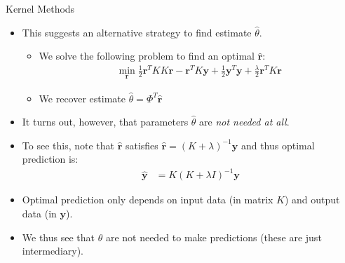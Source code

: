 \documentclass[handout,9pt]{beamer}
\begin{document}
\begin{frame}{Kernel Methods}
\begin{itemize}
  \setlength{\itemsep}{10pt}
\item This suggests an alternative strategy to find estimate $\hat{\theta}$. 
\begin{itemize}
\item We solve the following problem to find an optimal $\hat{\mathbf{r}}$: 
\begin{align*}
\min_{\mathbf{r}} \frac{1}{2}\mathbf{r}^TKK\mathbf{r}-\mathbf{r}^TK\mathbf{y}+\frac{1}{2}\mathbf{y}^T\mathbf{y}+\frac{\lambda}{2}\mathbf{r}^TK\mathbf{r}
\end{align*}
\item We recover estimate $\hat{\theta}=\Phi^T\hat{\mathbf{r}}$
\end{itemize}
\item It turns out, however, that parameters $\hat{\theta}$ are {\em not needed at all}. 
\item To see this, note that $\hat{\mathbf{r}}$ satisfies $\hat{\mathbf{r}}=(K+\lambda)^{-1}\mathbf{y}$ and thus optimal prediction is:
\begin{align*}
\hat{\mathbf{y}}&= K(K+\lambda I)^{-1}\mathbf{y}
\end{align*}
\item Optimal prediction only depends on input data (in matrix $K$) and output data (in $\mathbf{y}$).  

\item We thus see that $\theta$ are not needed to make predictions (these are just intermediary). 

\end{itemize}

\end{frame}

\end{document}
